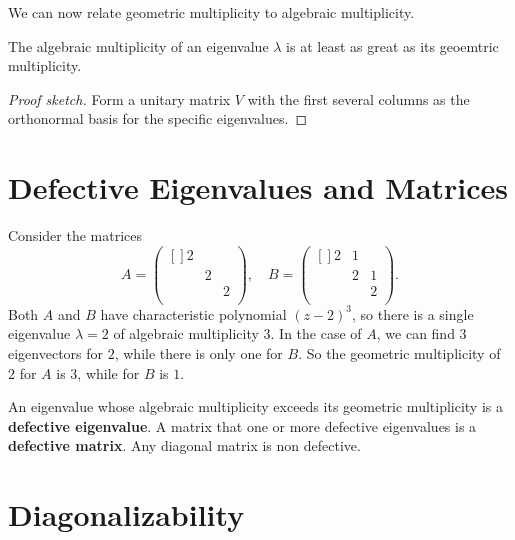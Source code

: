 We can now relate geometric multiplicity to algebraic multiplicity. 

\begin{theorem}
\label{thm: geo and alge multiplicity}
The algebraic multiplicity of an eigenvalue $ \lambda  $ is at least as great as its geoemtric multiplicity.
\end{theorem}
\begin{proof}[Proof sketch]
Form a unitary matrix $V$ with the first several columns as the orthonormal basis for the specific eigenvalues.
\end{proof}

\section{Defective Eigenvalues and Matrices}

\begin{example}
\label{eg: Defective eigenvalues and matrices}
Consider the matrices
\[
A = \begin{pmatrix}[] 
    2 &  &   \\
     & 2 &   \\
     &  &  2 \\
\end{pmatrix}, \quad 
B = \begin{pmatrix}[] 
    2 & 1 &   \\
     & 2 &  1 \\
     &  &  2 \\
\end{pmatrix}.    
\] 
Both $A$ and $B$ have characteristic polynomial $(z-2)^3$, so there is a single eigenvalue $ \lambda =2 $ of algebraic multiplicity $3$. In the case of $A$, we can find 3 eigenvectors for $2$, while there is only one for $B$. So the geometric multiplicity of $2$ for $A$ is $ 3 $, while for $B$ is $1$.      

\end{example}

 An eigenvalue whose algebraic multiplicity exceeds its geometric multiplicity is a \textbf{defective eigenvalue}. A matrix that one or more defective eigenvalues is a \textbf{defective matrix}. Any diagonal matrix is non defective.  

 \section{Diagonalizability}

